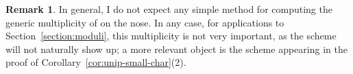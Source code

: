 \documentclass[11pt,reqno]{amsart}
\makeatletter
\theoremstyle{definition}
\newtheorem{remark}[theorem]{Remark}
\newcommand{\bA}{{\mathbf A}}
\newcommand{\bt}{{\mathbf t}}
\newcommand{\sC}{{\mathscr C}}
\DeclareMathOperator{\GL}{GL}
\newcommand{\ov}[1]{\overline{#1}}
\newcounter{mathrecordid}
\newcommand{\mathboxbegin}[1]{%
  \stepcounter{mathrecordid}%
  \immediate\write\mathrecords{\themathrecordid,#1}%
  \special{pdf:bann << /Type /Annot /Subtype /Link /Border [0 0 0]
    /MathBoxID \themathrecordid /F 2
    /A << /S /URI /URI (urn:mathbox:\themathrecordid) >> >>}}
\newcommand{\mathboxinlineplain}[1]{$#1$}
\newcommand{\mathboxinline}[1]{%
  $\mathboxbegin{inline}#1\special{pdf:eann}$}
\newcommand{\recordmath}{%
  \ifmeasuring@\expandafter\mathboxinlineplain
  \else\expandafter\mathboxinline\fi}
\makeatother
\begin{document}
\begin{remark}
    In general, I do not expect any simple method for computing the generic multiplicity of \recordmath{\chi^{-1}(\chi(t))} on the nose. In any case, for applications to Section~\ref{section:moduli}, this multiplicity is not very important, as the scheme \recordmath{\chi^{-1}(\chi(t))} will not naturally show up; a more relevant object is the scheme \recordmath{\sC_{\bt}} appearing in the proof of Corollary~\ref{cor:unip-small-char}(2).

\end{remark}
\end{document}
